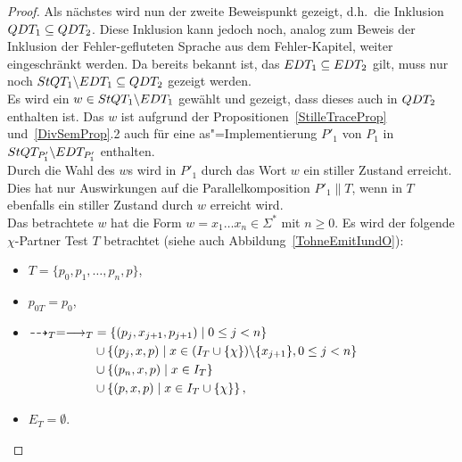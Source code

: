 \begin{proof}
  Als nächstes wird nun der zweite Beweispunkt gezeigt, d.h.\ die Inklusion
  $QDT _1\subseteq QDT _2$. Diese Inklusion kann jedoch noch, analog zum
  Beweis der Inklusion der Fehler-gefluteten Sprache aus dem Fehler-Kapitel,
  weiter eingeschränkt werden. Da bereits bekannt ist, das $EDT _1 \subseteq
  EDT _2$ gilt, muss nur noch $StQT _1\backslash EDT _1\subseteq QDT _2$
  gezeigt werden.\\
  Es wird ein $w\in StQT _1\backslash EDT _1$ gewählt und gezeigt, dass dieses
  auch in $QDT _2$ enthalten ist. Das $w$ ist aufgrund der
  Propositionen~\ref{StilleTraceProp} und~\ref{DivSemProp}.2 auch für eine
  as"=Implementierung $P'_1$ von $P_1$ in $StQT _{P'_1}\backslash EDT
  _{P'_1}$ enthalten.\\
  Durch die Wahl des $w$s wird in $P'_1$ durch das Wort $w$ ein stiller
  Zustand erreicht. Dies hat nur Auswirkungen auf die Parallelkomposition
  $P'_1\|T$, wenn in $T$ ebenfalls ein stiller Zustand durch $w$ erreicht
  wird.\\
  Das betrachtete $w$ hat die Form $w = x_1\dots x_n\in\Sigma ^*$ mit $n\geq
  0$. Es wird der folgende $\chi$-Partner Test $T$ betrachtet (siehe auch
  Abbildung~\ref{TohneEmitIundO}):
  \begin{itemize}
    \item $T=\{p_0,p_1,\dots ,p_n, p\}$,
    \item $p_{0T}=p_0$,
    \item $\begin{aligned}[t]
        \may _T = \must _T &= \left\{(p_j,x_{j+1},p_{j+1})\mid  0\leq j<
        n\right\}\\
        &\cup\left\{(p_j,x,p)\mid  x\in (I_T\cup
        \{\chi\})\backslash\{x_{j+1}\}, 0\leq j< n\right\}\\
        &\cup\left\{(p_n,x,p)\mid x\in I_T\right\}\\
        &\cup\left\{(p,x,p)\mid x\in I_T\cup\{\chi\}\right\},
    \end{aligned}$
    \item $E_T=\emptyset$.
  \end{itemize}
  \begin{figure} [h!tbp]
  \begin{center}
\end{center}
\end{figure}
\end{proof}
